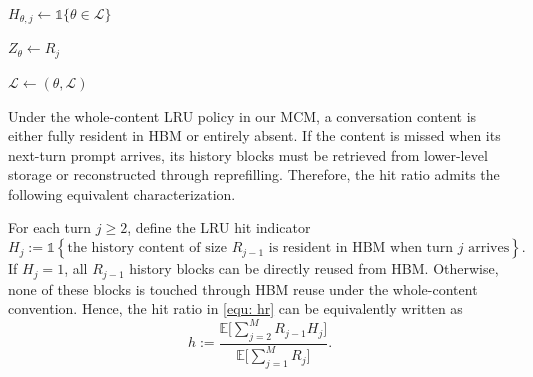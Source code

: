 \documentclass{article}
\theoremstyle{definition}
\newcommand{\E}{\mathbb E}
\newcommand{\one}{\mathds{1}}
\begin{document}
\begin{algorithm}[ht]
\caption{Whole-Content LRU}
\label{alg: Whole-Content LRU}
    
    
    $H_{\theta,j}\gets \one \{\theta\in\mathcal L\}$\;
    
    
    $Z_\theta\gets R_j$\;
    
    $\mathcal L\gets(\theta,\mathcal L)$
    
    \;
\end{algorithm}

Under the whole-content LRU policy in our MCM, a conversation content is either fully resident in HBM or entirely absent. If the content is missed when its next-turn prompt arrives, its history blocks must be retrieved from lower-level storage or reconstructed through reprefilling. Therefore, the  hit ratio admits the following equivalent characterization.

For each turn $j\geq 2$, define the LRU hit indicator
\[H_{j} := \one \left\{ \text{the history content of size $R_{j-1}$ is resident in HBM when turn $j$ arrives} \right\}.
\]
If $H_j=1$, all $R_{j-1}$ history blocks can be directly reused from HBM. Otherwise, none of these blocks is touched through HBM reuse under the whole-content convention. Hence, the  hit ratio in \eqref{equ:  hr} can be equivalently written as
\begin{equation}
    \label{equ:  hr LRU}
    h  :=\frac{\E \Big[\sum\limits_{j=2}^{M}R_{j-1}H_{j}\Big]}{\E \Big[\sum\limits_{j=1}^{M} R_j\Big]}.
\end{equation}
\end{document}
